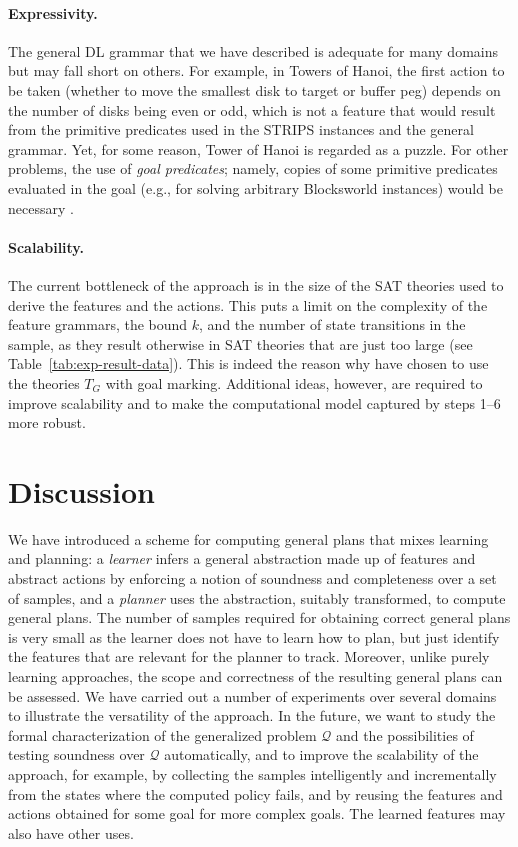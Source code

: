 \documentclass[letterpaper]{article} %
\newcommand{\Q}{\mathcal{Q}}
\begin{document}
\paragraph{Expressivity.} The general DL grammar that we have described
is adequate for many  domains but may fall short  on others. 
For example,  in Towers of Hanoi, the first action to be taken
(whether to move the smallest disk to target or buffer peg) depends
on the number of disks being even or  odd, which is not a feature
that  would result  from the primitive predicates used in the STRIPS
instances and the general grammar. Yet, for some reason,
Tower of Hanoi is regarded as a puzzle.  For other problems, the  use of \emph{goal predicates};
namely, copies of some primitive predicates  evaluated in the goal
(e.g., for solving arbitrary Blocksworld instances) would be  necessary  \cite{martin-geffner:generalized}.


\paragraph{Scalability.} The current bottleneck of the approach is 
in the size of the SAT  theories used to derive the features
and the actions. This puts a limit on the complexity of the
feature grammars, the bound $k$, and the number of state
transitions in the sample, as they  result otherwise
in SAT theories that are just too large (see Table~\ref{tab:exp-result-data}).
This is indeed the reason why have chosen to use the theories $T_G$
with goal marking. Additional ideas, however, are required
to improve scalability and to make the computational model
captured by  steps 1--6 more robust.


\section{Discussion}

We have introduced a scheme for computing general plans that mixes
learning and planning: a \emph{learner} infers a general abstraction made
up of features and abstract actions by enforcing a notion of soundness
and completeness over a  set of samples, and a \emph{planner}
uses the abstraction, suitably transformed, to compute general plans. 
The number of samples required for obtaining correct general plans is
very small as the learner does not have to learn how to plan, but
just identify the features that are relevant for the  planner to track.
Moreover, unlike purely learning approaches, the scope and correctness
of the resulting general plans can be assessed.
We have carried out a number of experiments over several domains to 
illustrate the versatility of the approach. In the future, we want 
to study the formal characterization  of the generalized problem $\Q$ and the possibilities of
testing soundness over $\Q$ automatically, and to improve the scalability of the approach,
for example, by collecting the samples intelligently and incrementally
from the states where the computed policy fails, and by reusing the
features and actions obtained for some goal for more complex goals.
The learned features may also have other uses.




\end{document}
